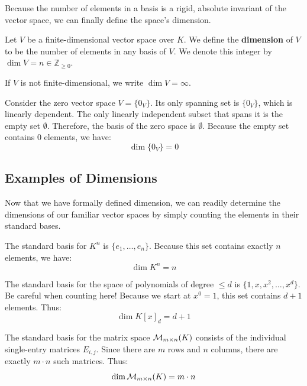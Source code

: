 Because the number of elements in a basis is a rigid, absolute invariant of the vector space, we can finally define the space's dimension.

\begin{definition}[Dimension]
Let $V$ be a finite-dimensional vector space over $K$. We define the \textbf{dimension} of $V$ to be the number of elements in any basis of $V$. 
We denote this integer by $\dim V = n \in \mathbb{Z}_{\ge 0}$.

If $V$ is not finite-dimensional, we write $\dim V = \infty$.
\end{definition}

\begin{remark}
Consider the zero vector space $V = \{0_V\}$. Its only spanning set is $\{0_V\}$, which is linearly dependent. The only linearly independent subset that spans it is the empty set $\emptyset$. 
Therefore, the basis of the zero space is $\emptyset$. Because the empty set contains $0$ elements, we have:
\[
\dim \{0_V\} = 0
\]
\end{remark}

\subsection{Examples of Dimensions}

Now that we have formally defined dimension, we can readily determine the dimensions of our familiar vector spaces by simply counting the elements in their standard bases.

\begin{example}
The standard basis for $K^n$ is $\{e_1, \dots, e_n\}$. Because this set contains exactly $n$ elements, we have:
\[
\dim K^n = n
\]
\end{example}

\begin{example}
The standard basis for the space of polynomials of degree $\le d$ is $\{1, x, x^2, \dots, x^d\}$. Be careful when counting here! Because we start at $x^0 = 1$, this set contains $d+1$ elements. Thus:
\[
\dim K[x]_d = d + 1
\]
\end{example}

\begin{example}[Matrices]
The standard basis for the matrix space $\mathcal{M}_{m \times n}(K)$ consists of the individual single-entry matrices $E_{i,j}$. Since there are $m$ rows and $n$ columns, there are exactly $m \cdot n$ such matrices. Thus:
\[
\dim \mathcal{M}_{m \times n}(K) = m \cdot n
\]
\end{example}

